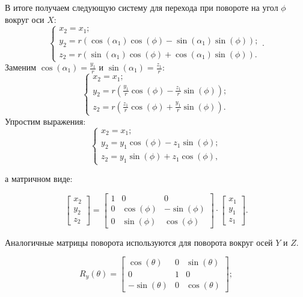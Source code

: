 В итоге получаем следующую систему для перехода при повороте на угол \(\phi\) вокруг оси \(X\):
\begin{equation}
\begin{cases}
    x_2 = x_1;\\
    y_2 = r (\cos(\alpha_1)\cos(\phi)-\sin(\alpha_1)\sin(\phi));\\
    z_2 = r (\sin(\alpha_1)\cos(\phi)+\cos(\alpha_1)\sin(\phi)).
\end{cases}.
\end{equation}
Заменим \(\cos(\alpha_1)=\frac{y_1}{r}\) и \(\sin(\alpha_1)=\frac{z_1}{r}\):
\begin{equation}
\begin{cases}
    x_2 = x_1;\\
    y_2 = r \left(\frac{y_1}{r}\cos(\phi)-\frac{z_1}{r}\sin(\phi)\right);\\
    z_2 = r \left(\frac{z_1}{r}\cos(\phi)+\frac{y_1}{r}\sin(\phi)\right).
\end{cases}
\end{equation}
Упростим выражения:
\begin{equation}
\begin{cases}
    x_2 = x_1;\\
    y_2 =  y_1 \cos(\phi)-z_1\sin(\phi);\\
    z_2 = y_1\sin(\phi)+z_1 \cos(\phi),
\end{cases}
\end{equation}

а матричном виде:

\begin{equation}
\begin{bmatrix}
    x_2 \\ y_2 \\z_2
\end{bmatrix} = 
\begin{bmatrix}
    1 & 0 & 0 \\
    0 & \cos(\phi) & -\sin(\phi) \\
    0 & \sin(\phi) & \cos(\phi)
\end{bmatrix}
\cdot
\begin{bmatrix}
    x_1 \\ y_1 \\z_1
\end{bmatrix}.
\end{equation}

Аналогичные матрицы поворота используются для поворота вокруг осей \(Y\) и \(Z\).

\begin{equation}
R_y(\theta) = \begin{bmatrix}
    \cos(\theta) & 0 & \sin(\theta) \\
    0 & 1 & 0 \\
    -\sin(\theta) & 0 & \cos(\theta)
\end{bmatrix}; 
\end{equation}

